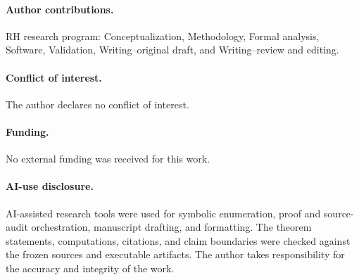 \documentclass[11pt]{article}
\theoremstyle{definition}
\theoremstyle{remark}
\begin{document}
\paragraph{Author contributions.}
RH research program: Conceptualization, Methodology, Formal analysis,
Software, Validation, Writing--original draft, and Writing--review and
editing.

\paragraph{Conflict of interest.}
The author declares no conflict of interest.

\paragraph{Funding.}
No external funding was received for this work.

\paragraph{AI-use disclosure.}
AI-assisted research tools were used for symbolic enumeration, proof and
source-audit orchestration, manuscript drafting, and formatting.  The
theorem statements, computations, citations, and claim boundaries were
checked against the frozen sources and executable artifacts.  The author
takes responsibility for the accuracy and integrity of the work.

\begingroup
\footnotesize
\raggedright


\endgroup
\end{document}

